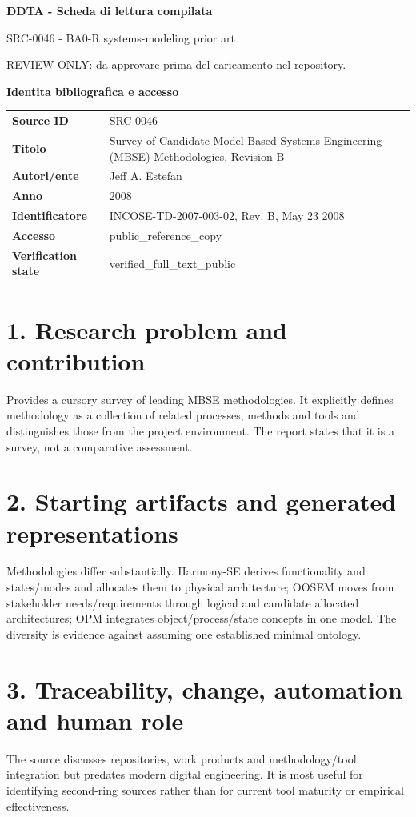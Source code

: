 \documentclass[10pt,a4paper]{article}
\newenvironment{factbox}[1]{\def\FrameCommand{\fcolorbox{ddtablue}{ddtagray}}\MakeFramed{\advance\hsize-2\width\FrameRestore}\noindent\textbf{#1}\par\smallskip}{\endMakeFramed}
\begin{document}
\begin{center}
{\LARGE\bfseries DDTA - Scheda di lettura compilata}\par
{\large SRC-0046 - BA0-R systems-modeling prior art}\par
{\small REVIEW-ONLY: da approvare prima del caricamento nel repository.}\par
\end{center}
\begin{factbox}{Identita bibliografica e accesso}
\begin{tabularx}{\linewidth}{>{\bfseries}p{3.4cm}X}
Source ID & SRC-0046\\
Titolo & Survey of Candidate Model-Based Systems Engineering (MBSE) Methodologies, Revision B\\
Autori/ente & Jeff A. Estefan\\
Anno & 2008\\
Identificatore & INCOSE-TD-2007-003-02, Rev. B, May 23 2008\\
Accesso & public\_reference\_copy\\
Verification state & verified\_full\_text\_public\\
\end{tabularx}
\end{factbox}
\section{1. Research problem and contribution}
Provides a cursory survey of leading MBSE methodologies. It explicitly defines methodology as a collection of related processes, methods and tools and distinguishes those from the project environment. The report states that it is a survey, not a comparative assessment.
\section{2. Starting artifacts and generated representations}
Methodologies differ substantially. Harmony-SE derives functionality and states/modes and allocates them to physical architecture; OOSEM moves from stakeholder needs/requirements through logical and candidate allocated architectures; OPM integrates object/process/state concepts in one model. The diversity is evidence against assuming one established minimal ontology.
\section{3. Traceability, change, automation and human role}
The source discusses repositories, work products and methodology/tool integration but predates modern digital engineering. It is most useful for identifying second-ring sources rather than for current tool maturity or empirical effectiveness.
\end{document}
